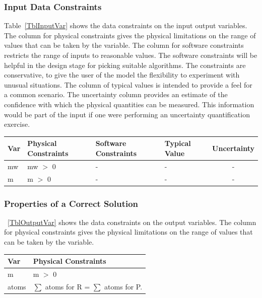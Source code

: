 \documentclass[12pt]{article}
\begin{document}
\subsubsection{Input Data Constraints} \label{sec_DataConstraints}    

Table~\ref{TblInputVar} shows the data constraints on the input output
variables.  The column for physical constraints gives the physical limitations
on the range of values that can be taken by the variable.  The column for
software constraints restricts the range of inputs to reasonable values.  The
software constraints will be helpful in the design stage for picking suitable
algorithms.  The constraints are conservative, to give the user of the model the
flexibility to experiment with unusual situations.  The column of typical values
is intended to provide a feel for a common scenario.  The uncertainty column
provides an estimate of the confidence with which the physical quantities can be
measured.  This information would be part of the input if one were performing an
uncertainty quantification exercise.


\begin{table}[!h]
  \caption{Input Variables} \label{TblInputVar}
  \renewcommand{\arraystretch}{1.2}
\noindent \begin{longtable*}{l l l l c} 
  \toprule
  \textbf{Var} & \textbf{Physical Constraints} & \textbf{Software Constraints} &
                             \textbf{Typical Value} & \textbf{Uncertainty}\\
  \midrule 
  mw & mw $>$ 0  &  - & - & - \\
    m  &  m $>$ 0  &  - & - & - \\
     
     \bottomrule
\end{longtable*}
\end{table}


\subsubsection{Properties of a Correct Solution} \label{sec_CorrectSolution}

\noindent
~\ref{TblOutputVar} shows the data constraints on the output variables. The column
for physical constraints gives the physical limitations on the range of values that can be
taken by the variable.

\begin{table}[!h]
\caption{Output Variables} \label{TblOutputVar}
\renewcommand{\arraystretch}{1.2}
\noindent \begin{longtable*}{l l} 
  \toprule
  \textbf{Var} & \textbf{Physical Constraints} \\
  \midrule 
  m & m $>$ 0 \\
  atoms &  $ \sum $ atoms for R =  $\sum$ atoms for P.   \\
   \bottomrule
\end{longtable*}
\end{table}
\end{document}
